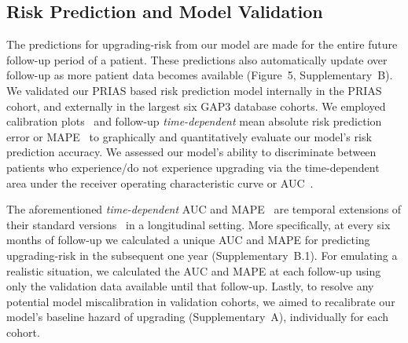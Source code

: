 \subsection{Risk Prediction and Model Validation}
The predictions for upgrading-risk from our model are made for the entire future follow-up period of a patient. These predictions also automatically update over follow-up as more patient data becomes available (Figure~5, Supplementary~B). We validated our PRIAS based risk prediction model internally in the PRIAS cohort, and externally in the largest six GAP3 database cohorts. We employed calibration plots~\citep{royston2013external,steyerberg2010assessing} and follow-up \textit{time-dependent} mean absolute risk prediction error or MAPE~\citep{rizopoulos2017dynamic} to graphically and quantitatively evaluate our model's risk prediction accuracy. We assessed our model's ability to discriminate between patients who experience/do not experience upgrading via the time-dependent area under the receiver operating characteristic curve or AUC~\citep{rizopoulos2017dynamic}. 

The aforementioned \textit{time-dependent} AUC and MAPE~\citep{rizopoulos2017dynamic} are temporal extensions of their standard versions~\citep{steyerberg2010assessing} in a longitudinal setting. More specifically, at every six months of follow-up we calculated a unique AUC and MAPE for predicting upgrading-risk in the subsequent one year (Supplementary~B.1). For emulating a realistic situation, we calculated the AUC and MAPE at each follow-up using only the validation data available until that follow-up. Lastly, to resolve any potential model miscalibration in validation cohorts, we aimed to recalibrate our model's baseline hazard of upgrading (Supplementary~A), individually for each cohort.